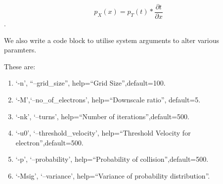 \documentclass[11pt]{article}
\providecommand{\tightlist}{%
      \setlength{\itemsep}{0pt}\setlength{\parskip}{0pt}}
\begin{document}
\[p_{X}(x)=p_{T}(t)*\frac {\partial t}{\partial x} \].

We also write a code block to utilise system arguments to alter various
paramters.

These are:

\begin{enumerate}
\def\labelenumi{\arabic{enumi}.}
\tightlist
\item
  `-n', ``--grid\_size'', help=``Grid Size'',default=100.
\item
  `-M',`--no\_of\_electrons', help=``Downscale ratio'', default=5.
\item
  `-nk', `--turns', help=``Number of iterations'',default=500.
\item
  `-u0', `--threshold\_velocity', help=``Threshold Velocity for
  electron'',default=500.
\item
  `-p', `--probability', help=``Probability of collision'',default=500.
\item
  `-Msig', `--variance', help=``Variance of probability distribution''.
\end{enumerate}
\end{document}
